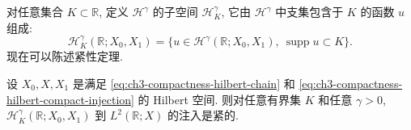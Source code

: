 \hypertarget{chapter-03-page-201}{}
对任意集合 $K\subset\mathbb R$, 定义 $\mathcal H^\gamma$ 的子空间 $\mathcal H_K^\gamma$, 它由 $\mathcal H^\gamma$ 中支集包含于 $K$ 的函数 $u$ 组成:
\begin{equation}
\mathcal H_K^\gamma(\mathbb R;X_0,X_1)
=\{u\in\mathcal H^\gamma(\mathbb R;X_0,X_1),\ \operatorname{supp}u\subset K\}.
\label{eq:ch3-compactness-supported-fractional-space}
\end{equation}
现在可以陈述紧性定理.

\begin{Theorem}
\label{thm:ch3-compactness-fractional}
设 $X_0,X,X_1$ 是满足 \eqref{eq:ch3-compactness-hilbert-chain} 和 \eqref{eq:ch3-compactness-hilbert-compact-injection} 的 Hilbert 空间. 则对任意有界集 $K$ 和任意 $\gamma>0$, $\mathcal H_K^\gamma(\mathbb R;X_0,X_1)$ 到 $L^2(\mathbb R;X)$ 的注入是紧的.
\end{Theorem}

